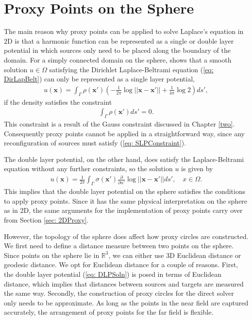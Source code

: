 \documentclass{sfuthesis}
\begin{document}

\section{Proxy Points on the Sphere}
\label{sec: 3DProxy}
The main reason why proxy points can be applied to solve Laplace's equation in 2D is that a harmonic function can be represented as a single or double layer potential in which sources only need to be placed along the boundary of the domain. 
For a simply connected domain on the sphere, \cite{GemmNigStein2008} shows that a smooth solution $u \in \Omega$ satisfying the Dirichlet Laplace-Beltrami equation (\ref{eq: DirLapBelt}) can only be represented as a single layer potential, 
\begin{align*}
	u(\mathbf{x})=\int_{\Gamma}\rho(\mathbf{x}')\left(-\frac{1}{2\pi}\log||\mathbf{x}-{\mathbf{x}'}||+\frac{1}{4\pi}\log2\right)ds', 
\end{align*}
if the density satisfies the constraint 
\begin{align}
	\int_{\Gamma}\rho(\mathbf{x}')ds'=0. \label{eq: SLPConstraint}
\end{align}
This constraint is a result of the Gauss constraint discussed in Chapter \ref{two}. Consequently proxy points cannot be applied in a straightforward way, since any reconfiguration of sources must satisfy (\ref{eq: SLPConstraint}). 

The double layer potential, on the other hand, does satisfy the Laplace-Beltrami equation without any further constraints, so the solution $u$ is given by 
\begin{align}
	u(\mathbf{x})=\frac{1}{2\pi}\int_{\Gamma}\sigma(\mathbf{x'})\frac{\partial}{\partial n'}\log||\mathbf{x}-\mathbf{x'}|| ds', \quad x \in \Omega.  \label{eq: DLPSoln} 
\end{align}
This implies that the double layer potential on the sphere satisfies the conditions to apply proxy points. Since it has the same physical interpretation on the sphere as in 2D, the same arguments for the implementation of proxy points carry over from Section \ref{sec: 2DProxy}. 

However, the topology of the sphere does affect how proxy circles are constructed. We first need to define a distance measure between two points on the sphere. 
Since points on the sphere lie in $\mathbb{R}^3$, we can either use 3D Euclidean distance or geodesic distance. We opt for Euclidean distance for a couple of reasons. First, the double layer potential (\ref{eq: DLPSoln}) is posed in terms of Euclidean distance, which implies that distances between sources and targets are measured the same way. Secondly, the construction of proxy circles for the direct solver only needs to be approximate. As long as the points in the near field are captured accurately, the arrangement of proxy points for the far field is flexible. 
\end{document}

